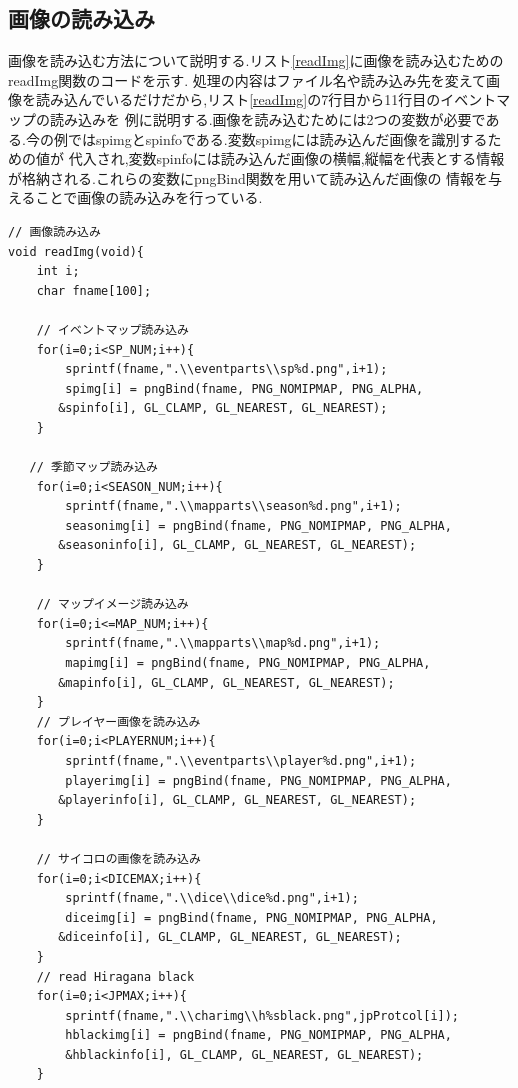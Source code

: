 \documentclass[a4j]{jarticle}
\begin{document}
  \subsection{画像の読み込み}
  画像を読み込む方法について説明する.リスト\ref{readImg}に画像を読み込むためのreadImg関数のコードを示す.
  処理の内容はファイル名や読み込み先を変えて画像を読み込んでいるだけだから,リスト\ref{readImg}の7行目から11行目のイベントマップの読み込みを
  例に説明する.画像を読み込むためには2つの変数が必要である.今の例ではspimgとspinfoである.変数spimgには読み込んだ画像を識別するための値が
  代入され,変数spinfoには読み込んだ画像の横幅,縦幅を代表とする情報が格納される.これらの変数にpngBind関数を用いて読み込んだ画像の
  情報を与えることで画像の読み込みを行っている.
  \begin{lstlisting}[basicstyle=\ttfamily\footnotesize, frame=single,label=readImg,caption=readImg関数]
// 画像読み込み
void readImg(void){
    int i;
    char fname[100];

    // イベントマップ読み込み
    for(i=0;i<SP_NUM;i++){
        sprintf(fname,".\\eventparts\\sp%d.png",i+1);
        spimg[i] = pngBind(fname, PNG_NOMIPMAP, PNG_ALPHA, 
       &spinfo[i], GL_CLAMP, GL_NEAREST, GL_NEAREST);        
    }

   // 季節マップ読み込み 
    for(i=0;i<SEASON_NUM;i++){
        sprintf(fname,".\\mapparts\\season%d.png",i+1);
        seasonimg[i] = pngBind(fname, PNG_NOMIPMAP, PNG_ALPHA, 
       &seasoninfo[i], GL_CLAMP, GL_NEAREST, GL_NEAREST);        
    }

    // マップイメージ読み込み
    for(i=0;i<=MAP_NUM;i++){
        sprintf(fname,".\\mapparts\\map%d.png",i+1);
        mapimg[i] = pngBind(fname, PNG_NOMIPMAP, PNG_ALPHA, 
       &mapinfo[i], GL_CLAMP, GL_NEAREST, GL_NEAREST);
    }
    // プレイヤー画像を読み込み
    for(i=0;i<PLAYERNUM;i++){
        sprintf(fname,".\\eventparts\\player%d.png",i+1);
        playerimg[i] = pngBind(fname, PNG_NOMIPMAP, PNG_ALPHA, 
       &playerinfo[i], GL_CLAMP, GL_NEAREST, GL_NEAREST);
    }

    // サイコロの画像を読み込み
    for(i=0;i<DICEMAX;i++){
        sprintf(fname,".\\dice\\dice%d.png",i+1);
        diceimg[i] = pngBind(fname, PNG_NOMIPMAP, PNG_ALPHA, 
       &diceinfo[i], GL_CLAMP, GL_NEAREST, GL_NEAREST);
    }
    // read Hiragana black
    for(i=0;i<JPMAX;i++){
        sprintf(fname,".\\charimg\\h%sblack.png",jpProtcol[i]);
        hblackimg[i] = pngBind(fname, PNG_NOMIPMAP, PNG_ALPHA, 
        &hblackinfo[i], GL_CLAMP, GL_NEAREST, GL_NEAREST);
    }


\end{lstlisting}
\end{document}
